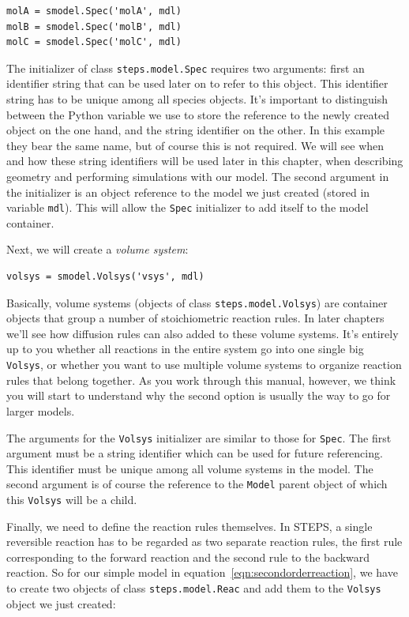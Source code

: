 \documentclass[a4paper,12pt]{book}
\begin{document}
\begin{verbatim}
molA = smodel.Spec('molA', mdl)
molB = smodel.Spec('molB', mdl)
molC = smodel.Spec('molC', mdl)
\end{verbatim}

The initializer of class \texttt{steps.model.Spec} requires two arguments: first an identifier string that can be used later on to refer to this object. This identifier string has to be unique among all species objects. It's important to distinguish between the Python variable we use to store the reference to the newly created object on the one hand, and the string identifier on the other. In this example they bear the same name, but of course this is not required. We will see when and how these string identifiers will be used later in this chapter, when describing geometry and performing simulations with our model. The second argument in the initializer is an object reference to the model we just created (stored in variable \texttt{mdl}). This will allow the \texttt{Spec} initializer to add itself to the model container.

Next, we will create a \emph{volume system}:

\begin{verbatim}
volsys = smodel.Volsys('vsys', mdl)
\end{verbatim}

Basically, volume systems (objects of class \texttt{steps.model.Volsys}) are container objects that group a number of stoichiometric reaction rules. In later chapters we'll see how diffusion rules can also added to these volume systems. It's entirely up to you whether all reactions in the entire system go into one single big \texttt{Volsys}, or whether you want to use multiple volume systems to organize reaction rules that belong together. As you work through this manual, however, we think you will start to understand why the second option is usually the way to go for larger models.

The arguments for the \texttt{Volsys} initializer are similar to those for \texttt{Spec}. The first argument must be a string identifier which can be used for future referencing. This identifier must be unique among all volume systems in the model. The second argument is of course the reference to the \texttt{Model} parent object of which this \texttt{Volsys} will be a child.

Finally, we need to define the reaction rules themselves. In STEPS, a single reversible reaction has to be regarded as two separate reaction rules, the first rule corresponding to the forward reaction and the second rule to the backward reaction. So for our simple model in equation~\ref{eqn:secondorderreaction}, we have to create two objects of class \texttt{steps.model.Reac} and add them to the \texttt{Volsys} object we just created:
\end{document}
